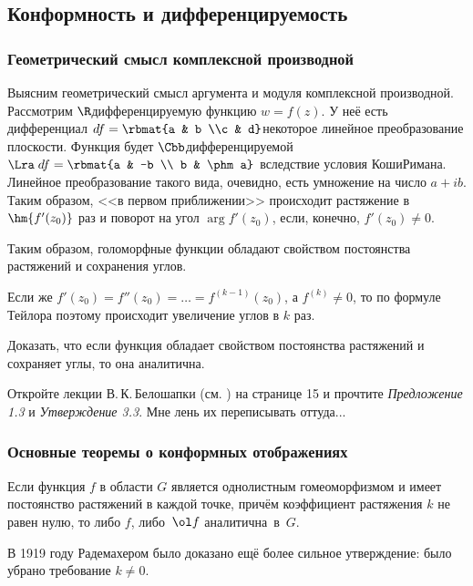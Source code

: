 \documentclass[a4paper]{article}
\begin{document}
\subsection{Конформность и дифференцируемость}

\subsubsection{Геометрический смысл комплексной производной}

Выясним геометрический смысл аргумента и модуля комплексной производной. Рассмотрим $\R$\д дифференцируемую функцию
$w= f(z)$. У неё есть дифференциал $df = \rbmat{a & b \\c & d}$\т некоторое линейное преобразование плоскости.
Функция будет $\Cbb$\д дифференцируемой $\Lra \; df = \rbmat{a & -b \\ b & \phm a}$ вследствие условия Коши\ч Римана.
Линейное преобразование такого вида, очевидно, есть умножение на число $a+ib$. Таким образом, <<в первом приближении>>
происходит растяжение в $\hm{f'(z_0)}$ раз и поворот на угол $\arg f'(z_0)$, если, конечно, $f'(z_0)\neq 0$.

Таким образом, голоморфные функции обладают свойством постоянства растяжений и сохранения углов.

Если же $f'(z_0) = f''(z_0) = \ldots = f^{(k-1)}(z_0)$, а $f^{(k)}\neq 0$, то по формуле Тейлора
поэтому происходит увеличение углов в $k$ раз.

\begin{problem}
Доказать, что если функция обладает свойством постоянства растяжений и сохраняет углы, то она аналитична.
\end{problem}
\begin{solution}
Откройте лекции В.\,К.\,Белошапки (см. \dmvnwebsite) на странице 15 и прочтите \emph{Предложение 1.3} и \emph{Утверждение 3.3}.
Мне лень их переписывать оттуда...
\end{solution}

\subsubsection{Основные теоремы о конформных отображениях}

\begin{theorem}[Х.\,Бор, 1918 г.]
Если функция $f$ в области $G$ является однолистным гомеоморфизмом и имеет постоянство растяжений в каждой точке, причём
коэффициент растяжения $k$ не равен нулю, то либо $f$, либо~$\ol f$ аналитична~в~$G$.
\end{theorem}
В 1919 году Радемахером было доказано ещё более сильное утверждение: было убрано требование $k\neq 0$.
\end{document}
